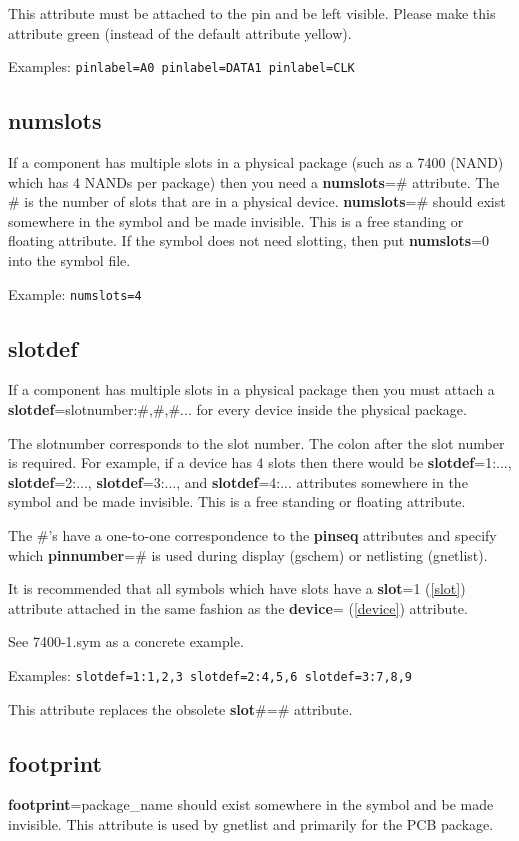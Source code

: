 \documentclass{article}
\begin{document}
This attribute must be attached to the pin and be left visible.  Please
make this attribute green (instead of the default attribute yellow).

Examples: \texttt{pinlabel=A0 pinlabel=DATA1 pinlabel=CLK}


\subsection{\bf numslots\label{numslots}}
If a component has multiple slots in a physical package (such as a 7400
(NAND) which has 4 NANDs per package) then you need a {\bf numslots}=\#
attribute.  The \# is the number of slots that are in a physical device.
{\bf numslots}=\# should exist somewhere in the symbol and be made
invisible.  This is a free standing or floating attribute.  If the symbol
does not need slotting, then put {\bf numslots}=0 into the symbol file.

Example: \texttt{numslots=4}


\subsection{\bf slotdef\label{slotdef}}
If a component has multiple slots in a physical package then you must 
attach a {\bf slotdef}=slotnumber:\#,\#,\#... for every device inside
the physical package.

The slotnumber corresponds to the slot number.  The colon after the
slot number is required.  For example, if a device has 4 slots then there
would be {\bf slotdef}=1:..., {\bf slotdef}=2:..., {\bf slotdef}=3:...,
and {\bf slotdef}=4:...  attributes somewhere in the symbol and be
made invisible.  This is a free standing or floating attribute.

The \#'s have a one-to-one correspondence to the {\bf pinseq} attributes
and specify which {\bf pinnumber}=\# is used during display (gschem)
or netlisting (gnetlist).

It is recommended that all symbols which have slots have a {\bf slot}=1
(\ref{slot}) attribute attached in the same fashion as the {\bf device}=
(\ref{device}) attribute.

See 7400-1.sym as a concrete example.

Examples: \texttt{slotdef=1:1,2,3 slotdef=2:4,5,6 slotdef=3:7,8,9}

This attribute replaces the obsolete {\bf slot}\#=\# attribute.



\subsection{\bf footprint\label{footprint}}
{\bf footprint}=package\_name should exist somewhere in the symbol and
be made invisible.  This attribute is used by gnetlist and primarily
for the PCB package.
\end{document}
